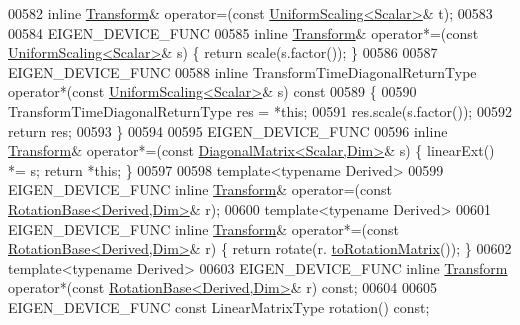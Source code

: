 \begin{DoxyCode}
00582   \textcolor{keyword}{inline} \hyperlink{group___geometry___module_class_eigen_1_1_transform}{Transform}& operator=(\textcolor{keyword}{const} \hyperlink{class_eigen_1_1_uniform_scaling}{UniformScaling<Scalar>}& t);
00583   
00584   EIGEN\_DEVICE\_FUNC
00585   \textcolor{keyword}{inline} \hyperlink{group___geometry___module_class_eigen_1_1_transform}{Transform}& operator*=(\textcolor{keyword}{const} \hyperlink{class_eigen_1_1_uniform_scaling}{UniformScaling<Scalar>}& s) \{ \textcolor{keywordflow}{return} 
      scale(s.factor()); \}
00586   
00587   EIGEN\_DEVICE\_FUNC
00588   \textcolor{keyword}{inline} TransformTimeDiagonalReturnType operator*(\textcolor{keyword}{const} \hyperlink{class_eigen_1_1_uniform_scaling}{UniformScaling<Scalar>}& s)\textcolor{keyword}{
       const}
00589 \textcolor{keyword}{  }\{
00590     TransformTimeDiagonalReturnType res = *\textcolor{keyword}{this};
00591     res.scale(s.factor());
00592     \textcolor{keywordflow}{return} res;
00593   \}
00594 
00595   EIGEN\_DEVICE\_FUNC
00596   \textcolor{keyword}{inline} \hyperlink{group___geometry___module_class_eigen_1_1_transform}{Transform}& operator*=(\textcolor{keyword}{const} \hyperlink{group___core___module_class_eigen_1_1_diagonal_matrix}{DiagonalMatrix<Scalar,Dim>}& s) \{ 
      linearExt() *= s; \textcolor{keywordflow}{return} *\textcolor{keyword}{this}; \}
00597 
00598   \textcolor{keyword}{template}<\textcolor{keyword}{typename} Derived>
00599   EIGEN\_DEVICE\_FUNC \textcolor{keyword}{inline} \hyperlink{group___geometry___module_class_eigen_1_1_transform}{Transform}& operator=(\textcolor{keyword}{const} 
      \hyperlink{class_eigen_1_1_rotation_base}{RotationBase<Derived,Dim>}& r);
00600   \textcolor{keyword}{template}<\textcolor{keyword}{typename} Derived>
00601   EIGEN\_DEVICE\_FUNC \textcolor{keyword}{inline} \hyperlink{group___geometry___module_class_eigen_1_1_transform}{Transform}& operator*=(\textcolor{keyword}{const} 
      \hyperlink{class_eigen_1_1_rotation_base}{RotationBase<Derived,Dim>}& r) \{ \textcolor{keywordflow}{return} rotate(r.
      \hyperlink{class_eigen_1_1_rotation_base_aac726e89402a427c605514ce31b01e42}{toRotationMatrix}()); \}
00602   \textcolor{keyword}{template}<\textcolor{keyword}{typename} Derived>
00603   EIGEN\_DEVICE\_FUNC \textcolor{keyword}{inline} \hyperlink{group___geometry___module_class_eigen_1_1_transform}{Transform} operator*(\textcolor{keyword}{const} 
      \hyperlink{class_eigen_1_1_rotation_base}{RotationBase<Derived,Dim>}& r) \textcolor{keyword}{const};
00604 
00605   EIGEN\_DEVICE\_FUNC \textcolor{keyword}{const} LinearMatrixType rotation() \textcolor{keyword}{const};

\end{DoxyCode}
